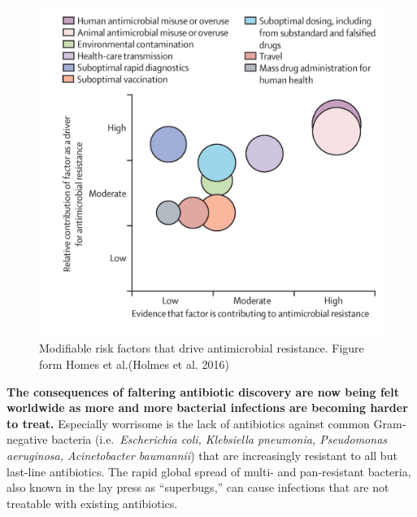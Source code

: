 \documentclass[
  letterpaper,
  DIV=11,
  numbers=noendperiod]{scrreprt}
\begin{document}
\begin{figure}

{\centering 

\includegraphics[width=5.20833in,height=\textheight]{images/modifiablerisk.png}

}

\caption{\label{fig-resistancedrivers}Modifiable risk factors that drive
antimicrobial resistance. Figure form Homes et al.(Holmes et al. 2016)}

\end{figure}

\textbf{The consequences of faltering antibiotic discovery are now being
felt worldwide as more and more bacterial infections are becoming harder
to treat.} Especially worrisome is the lack of antibiotics against
common Gram-negative bacteria (i.e.~\emph{Escherichia coli, Klebsiella
pneumonia, Pseudomonas aeruginosa, Acinetobacter baumannii}) that are
increasingly resistant to all but last-line antibiotics. The rapid
global spread of multi- and pan-resistant bacteria, also known in the
lay press as ``superbugs,'' can cause infections that are not treatable
with existing antibiotics.
\end{document}
